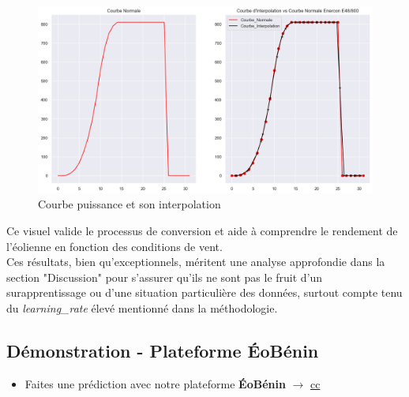 \documentclass[12pt]{article}
\begin{document}
\begin{itemize}[label=$\color{blue}\ast$]
	\begin{figure}[H]
		\centering
		\includegraphics[width=0.8\linewidth]{../graphique/courbe_puissance}
		\caption{Courbe puissance et son interpolation}
		\label{fig:curvepower}
	\end{figure}
	Ce visuel valide le processus de conversion et aide à comprendre le rendement de l'éolienne en fonction des conditions de vent.\\
	Ces résultats, bien qu'exceptionnels, méritent une analyse approfondie dans la section "Discussion" pour s'assurer qu'ils ne sont pas le fruit d'un surapprentissage ou d'une situation particulière des données, surtout compte tenu du \textit{learning\_rate} élevé mentionné dans la méthodologie.
\end{itemize}
\subsection{Démonstration - Plateforme ÉoBénin}
\begin{itemize}
	\item Faites une prédiction avec notre plateforme \textbf{\color{red} ÉoBénin} $\rightarrow$ \href{cc}{cc}
\end{itemize}
\end{document}
